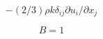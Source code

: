 

\begin{equation}
- (2/3) \rho k \delta_{ij} \partial u_i / \partial x_j
\end{equation}

\begin{equation}
B=1
\end{equation}


